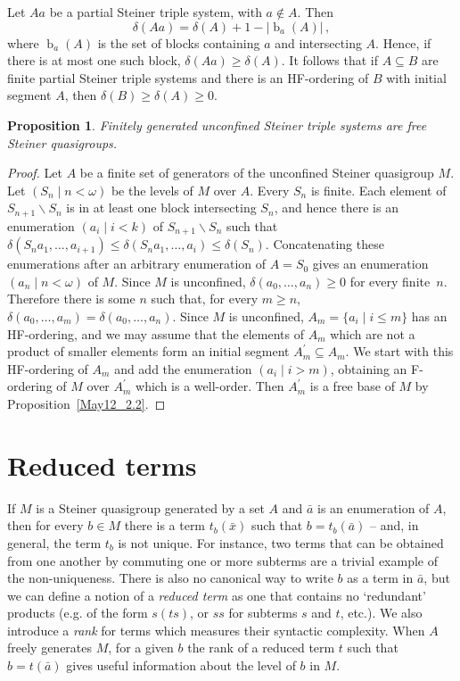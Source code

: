 \documentclass[a4paper, 11pt]{article}
\DeclareMathOperator{\bl}{b}
\theoremstyle{note}
\newtheorem{prop}[thm]{Proposition}
\begin{document}
 Let $Aa$ be a partial Steiner triple system, with $a\not\in A$. Then 
$$\delta(Aa)= \delta(A)+1-|\bl_a(A)| \, ,$$
 where $\bl_a(A)$ is the set of blocks containing $a$ and intersecting $A$. Hence, if there is at most one such block, $\delta(Aa)\geq \delta(A)$. It follows that if $A\subseteq B$ are finite partial Steiner triple systems and there is an HF-ordering of $B$ with initial segment $A$, then $\delta(B)\geq\delta(A)\geq 0$.

	

	
\begin{prop}\label{2024_nov4}
	Finitely generated unconfined Steiner triple systems are free Steiner quasigroups.
\end{prop}
\begin{proof} Let $A$ be a finite set of generators of the unconfined Steiner quasigroup $M$. Let $(S_n\mid n<\omega)$ be the levels of $M$ over $A$. Every $S_n$ is finite. Each element of  $S_{n+1}\smallsetminus S_n$ is in at least one block intersecting $S_n$, and hence  there is an enumeration $(a_i\mid i<k)$ of $S_{n+1}\smallsetminus S_n$ such that  $\delta(S_na_1,\ldots,a_{i+1})\leq \delta(S_na_1,\ldots,a_i)\leq \delta(S_n)$. Concatenating  these enumerations after an arbitrary enumeration of $A=S_0$ gives an enumeration $(a_n\mid n<\omega)$ of $M$. Since $M$ is unconfined, $\delta(a_0,\ldots,a_n)\geq 0$  for every finite~$n$. Therefore there is some $n$  such that, for every $m\geq n$,\,  $\delta(a_0,\ldots,a_m)= \delta(a_0,\ldots,a_n)$. Since $M$ is unconfined, $A_m=\{a_i\mid i\leq m\}$ has an HF-ordering, and we may assume that the elements of $A_m$ which are not a product of smaller elements form an initial segment $A^\prime_m\subseteq A_m$. We start with this HF-ordering of $A_m$ and add the enumeration $(a_i\mid i>m)$, obtaining an F-ordering of $M$ over $A^\prime_m$ which is a well-order. Then $A^\prime_m$ is a free base of $M$ by Proposition~\ref{May12_2.2}.
	

\end{proof}				
	
 	
	\section{Reduced terms}
	
If $M$ is a Steiner quasigroup generated by a set $A$ and $\bar{a}$ is an enumeration of $A$, then for every $b \in M$ there is a term $t_b(\bar{x})$ such that $b=t_b(\bar{a})$ -- and, in general, the term $t_b$ is not unique. For instance, two terms that can be obtained from one another by commuting one or more subterms are a trivial example of the non-uniqueness. There is also no canonical way to write $b$ as a term in $\bar{a}$, but we can define a notion of a \textit{reduced term} as one that contains no `redundant' products (e.g. of the form $s(ts)$, or $ss$ for subterms $s$ and $t$, etc.). We also introduce a \textit{rank} for terms which measures their syntactic complexity. 
 When $A$ freely generates $M$, for a given $b$ the rank of a reduced term $t$ such that $b=t(\bar{a})$ gives useful information about the level of $b$ in $M$.	
	
\end{document}

